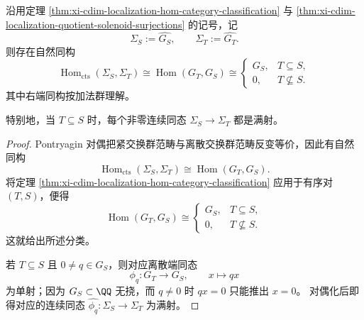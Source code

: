 \begin{theorem}\label{thm:xi-cdim-localization-solenoid-continuous-hom-classification}
沿用定理 \ref{thm:xi-cdim-localization-hom-category-classification} 与
\ref{thm:xi-cdim-localization-quotient-solenoid-surjections} 的记号，记
\[
\Sigma_S:=\widehat{G_S},
\qquad
\Sigma_T:=\widehat{G_T}.
\]
则存在自然同构
\[
\operatorname{Hom}_{\mathrm{cts}}(\Sigma_S,\Sigma_T)
\cong
\operatorname{Hom}(G_T,G_S)
\cong
\begin{cases}
G_S,& T\subseteq S,\\[1mm]
0,& T\not\subseteq S.
\end{cases}
\]
其中右端同构按加法群理解。

特别地，当 \(T\subseteq S\) 时，每个非零连续同态
\(
\Sigma_S\to \Sigma_T
\)
都是满射。
\end{theorem}
\begin{proof}
Pontryagin 对偶把紧交换群范畴与离散交换群范畴反变等价，因此有自然同构
\[
\operatorname{Hom}_{\mathrm{cts}}(\Sigma_S,\Sigma_T)
\cong
\operatorname{Hom}(G_T,G_S).
\]
将定理 \ref{thm:xi-cdim-localization-hom-category-classification} 应用于有序对 \((T,S)\)，便得
\[
\operatorname{Hom}(G_T,G_S)\cong
\begin{cases}
G_S,& T\subseteq S,\\
0,& T\not\subseteq S.
\end{cases}
\]
这就给出所述分类。

若 \(T\subseteq S\) 且 \(0\neq q\in G_S\)，则对应离散端同态
\[
\phi_q:G_T\to G_S,\qquad x\mapsto qx
\]
为单射；因为 \(G_S\subset\QQ\) 无挠，而 \(q\neq 0\) 时 \(qx=0\) 只能推出 \(x=0\)。
对偶化后即得对应的连续同态 \(\widehat{\phi_q}:\Sigma_S\to\Sigma_T\) 为满射。
\end{proof}

